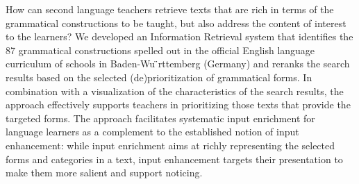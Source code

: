 How can second language teachers retrieve texts that are rich in terms of the grammatical constructions to be taught, but also address the content of interest to the learners? We developed an Information Retrieval system that identifies the 87 grammatical constructions spelled out in the official English language curriculum of schools in Baden-Wu ̈rttemberg (Germany) and reranks the search results based on the selected (de)prioritization of grammatical forms. In combination with a visualization of the characteristics of the search results, the approach effectively supports teachers in prioritizing those texts that provide the targeted forms. The approach facilitates systematic input enrichment for language learners as a complement to the established notion of input enhancement: while input enrichment aims at richly representing the selected forms and categories in a text, input enhancement targets their presentation to make them more salient and support noticing.
